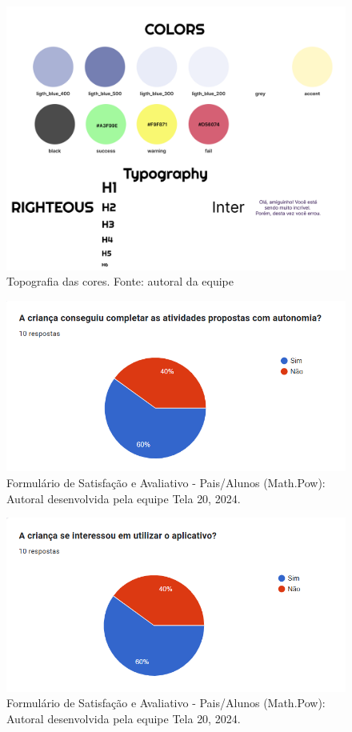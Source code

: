\documentclass[12pt, openany, oneside, a4paper, english, brazil]{abntex2}   %
\begin{document}
\begin{figure}[h!]
    \centering
    \includegraphics[width=0.8\linewidth]{figuras/Math.Pow App/Topografia.png}
    \caption{Topografia das cores. Fonte: autoral da equipe}
    \label{fig:Figma}
\end{figure}

\begin{figure}
    \centering
    \includegraphics{figuras/Formulário Gráficos/Pais/1 A crianca conseguiu completar as atividades propostas com autonomia.png}
    \caption{Formulário de Satisfação e Avaliativo  - Pais/Alunos (Math.Pow):  Autoral desenvolvida pela equipe Tela 20, 2024.}
    \label{gráfico gerado pelo formulário}
\end{figure}

\begin{figure}
    \centering
    \includegraphics{figuras/Formulário Gráficos/Pais/2 A crianca se interessou em utilizar o aplicativo.png}
    \caption{Formulário de Satisfação e Avaliativo  - Pais/Alunos (Math.Pow):  Autoral desenvolvida pela equipe Tela 20, 2024.}
    \label{gráfico gerado pelo formulário}
\end{figure}
\end{document}
